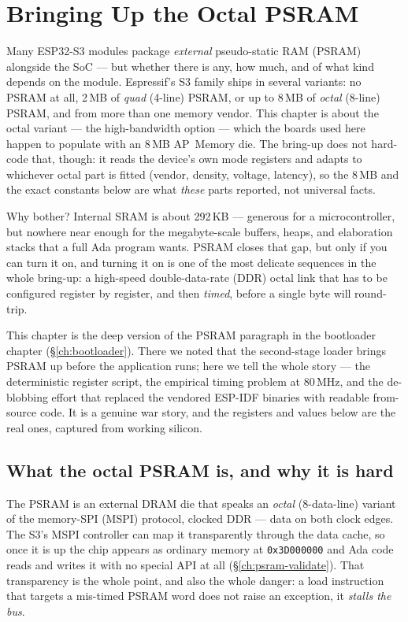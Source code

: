 \chapter{Bringing Up the Octal PSRAM}
\label{ch:psram}

Many ESP32-S3 modules package \emph{external} pseudo-static RAM (PSRAM) alongside
the SoC --- but whether there is any, how much, and of what kind depends on the
module. Espressif's S3 family ships in several variants: no PSRAM at all, 2\,MB of
\emph{quad} (4-line) PSRAM, or up to 8\,MB of \emph{octal} (8-line) PSRAM, and from
more than one memory vendor. This chapter is about the octal variant --- the
high-bandwidth option --- which the boards used here happen to populate with an
8\,MB AP~Memory die. The bring-up does not hard-code that, though: it reads the
device's own mode registers and adapts to whichever octal part is fitted (vendor,
density, voltage, latency), so the 8\,MB and the exact constants below are what
\emph{these} parts reported, not universal facts.

Why bother? Internal SRAM is about 292\,KB --- generous for a microcontroller, but
nowhere near enough for the megabyte-scale buffers, heaps, and elaboration stacks
that a full Ada program wants. PSRAM closes that gap, but only if you can turn it
on, and turning it on is one of the most delicate sequences in the whole bring-up:
a high-speed double-data-rate (DDR) octal link that has to be configured register
by register, and then \emph{timed}, before a single byte will round-trip.

This chapter is the deep version of the PSRAM paragraph in the bootloader chapter
(\S\ref{ch:bootloader}). There we noted that the second-stage loader brings PSRAM
up before the application runs; here we tell the whole story --- the deterministic
register script, the empirical timing problem at 80\,MHz, and the de-blobbing
effort that replaced the vendored ESP-IDF binaries with readable from-source code.
It is a genuine war story, and the registers and values below are the real ones,
captured from working silicon.

\section{What the octal PSRAM is, and why it is hard}

The PSRAM is an external DRAM die that speaks an \emph{octal} (8-data-line) variant
of the memory-SPI (MSPI) protocol, clocked DDR --- data on both clock edges. The
S3's MSPI controller can map it transparently through the data cache, so once it is
up the chip appears as ordinary memory at \texttt{0x3D000000} and Ada code reads and
writes it with no special API at all (\S\ref{ch:psram-validate}). That transparency
is the whole point, and also the whole danger: a load instruction that targets a
mis-timed PSRAM word does not raise an exception, it \emph{stalls the bus}.

